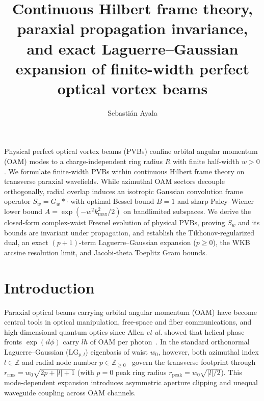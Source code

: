 \documentclass{optica-article}
\newcommand{\abs}[1]{\lvert #1 \rvert}
\begin{document}
\title{Continuous Hilbert frame theory, paraxial propagation invariance, and exact Laguerre--Gaussian expansion of finite-width perfect optical vortex beams}

\author{Sebasti\'an Ayala\authormark{*}}

\address{Independent Researcher, Cauquenes, Chile\\
ORCID: \href{https://orcid.org/0009-0003-7348-3883}{0009-0003-7348-3883}}


\begin{abstract*}
Physical perfect optical vortex beams (PVBs) confine orbital angular momentum (OAM) modes to a charge-independent ring radius $R$ with finite half-width $w > 0$. We formulate finite-width PVBs within continuous Hilbert frame theory on transverse paraxial wavefields. While azimuthal OAM sectors decouple orthogonally, radial overlap induces an isotropic Gaussian convolution frame operator $S_w = G_w * \cdot$ with optimal Bessel bound $B = 1$ and sharp Paley--Wiener lower bound $A = \exp(-w^2 k_{\max}^2/2)$ on bandlimited subspaces. We derive the closed-form complex-waist Fresnel evolution of physical PVBs, proving $S_w$ and its bounds are invariant under propagation, and establish the Tikhonov-regularized dual, an exact $(p+1)$-term Laguerre--Gaussian expansion ($p \ge 0$), the WKB arcsine resolution limit, and Jacobi-theta Toeplitz Gram bounds.
\end{abstract*}

\section{Introduction}
\label{sec:intro}

Paraxial optical beams carrying orbital angular momentum (OAM) have become central tools in optical manipulation, free-space and fiber communications, and high-dimensional quantum optics since Allen \emph{et al.} showed that helical phase fronts $\exp(il\phi)$ carry $l\hbar$ of OAM per photon~\cite{Allen1992,Siegman1986,Padgett2011,Erhard2018}. In the standard orthonormal Laguerre--Gaussian ($\mathrm{LG}_{p,l}$) eigenbasis of waist $w_0$, however, both azimuthal index $l \in \mathbb{Z}$ and radial node number $p \in \mathbb{Z}_{\ge 0}$~\cite{Plick2015,Karimi2014} govern the transverse footprint through $r_{\mathrm{rms}} = w_0\sqrt{2p+\abs{l}+1}$ (with $p=0$ peak ring radius $r_{\mathrm{peak}} = w_0\sqrt{\abs{l}/2}$). This mode-dependent expansion introduces asymmetric aperture clipping and unequal waveguide coupling across OAM channels.
\end{document}
